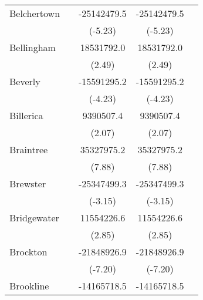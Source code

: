 {\begin{tabular}{l*{4}{c}}
\addlinespace
Belchertown         &                     & -25142479.5\sym{***}& -25142479.5\sym{***}&                     \\
                    &                     &     (-5.23)         &     (-5.23)         &                     \\
\addlinespace
Bellingham          &                     &  18531792.0\sym{*}  &  18531792.0\sym{*}  &                     \\
                    &                     &      (2.49)         &      (2.49)         &                     \\
\addlinespace
Beverly             &                     & -15591295.2\sym{***}& -15591295.2\sym{***}&                     \\
                    &                     &     (-4.23)         &     (-4.23)         &                     \\
\addlinespace
Billerica           &                     &   9390507.4\sym{*}  &   9390507.4\sym{*}  &                     \\
                    &                     &      (2.07)         &      (2.07)         &                     \\
\addlinespace
Braintree           &                     &  35327975.2\sym{***}&  35327975.2\sym{***}&                     \\
                    &                     &      (7.88)         &      (7.88)         &                     \\
\addlinespace
Brewster            &                     & -25347499.3\sym{**} & -25347499.3\sym{**} &                     \\
                    &                     &     (-3.15)         &     (-3.15)         &                     \\
\addlinespace
Bridgewater         &                     &  11554226.6\sym{**} &  11554226.6\sym{**} &                     \\
                    &                     &      (2.85)         &      (2.85)         &                     \\
\addlinespace
Brockton            &                     & -21848926.9\sym{***}& -21848926.9\sym{***}&                     \\
                    &                     &     (-7.20)         &     (-7.20)         &                     \\
\addlinespace
Brookline           &                     & -14165718.5         & -14165718.5         &                     \\

\end{tabular}}
